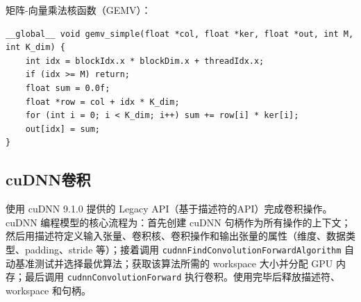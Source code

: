 \documentclass{SYSUReport}
\begin{document}
矩阵-向量乘法核函数（GEMV）：
\begin{lstlisting}[style=cuda_cpp, caption={矩阵-向量乘法核函数}]
__global__ void gemv_simple(float *col, float *ker, float *out, int M, int K_dim) {
    int idx = blockIdx.x * blockDim.x + threadIdx.x;
    if (idx >= M) return;
    float sum = 0.0f;
    float *row = col + idx * K_dim;
    for (int i = 0; i < K_dim; i++) sum += row[i] * ker[i];
    out[idx] = sum;
}
\end{lstlisting}

\subsection{cuDNN卷积}
使用 cuDNN 9.1.0 提供的 Legacy API（基于描述符的API）完成卷积操作。cuDNN 编程模型的核心流程为：首先创建 cuDNN 句柄作为所有操作的上下文；然后用描述符定义输入张量、卷积核、卷积操作和输出张量的属性（维度、数据类型、padding、stride 等）；接着调用 \texttt{cudnnFindConvolutionForwardAlgorithm} 自动基准测试并选择最优算法；获取该算法所需的 workspace 大小并分配 GPU 内存；最后调用 \texttt{cudnnConvolutionForward} 执行卷积。使用完毕后释放描述符、workspace 和句柄。
\end{document}
